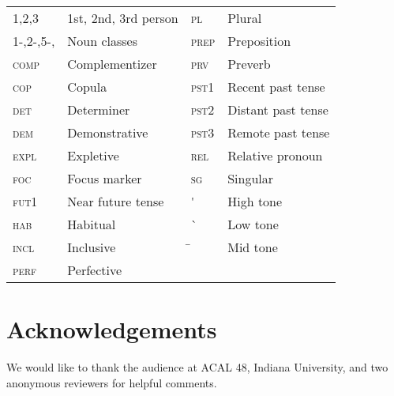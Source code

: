 \documentclass[output=paper,
modfonts
]{langscibook}
\begin{document}
\begin{tabular}{ll|ll}
		1,2,3 	& 1st, 2nd, 3rd person & \textsc{pl}  & Plural   \\ 
        1-,2-,5-, 	& Noun classes &  \textsc{prep}  & Preposition     \\
        \textsc{comp}  & Complementizer  & \textsc{prv}  & Preverb   \\
        \textsc{cop}  & Copula  &  \textsc{pst1}  & Recent past tense \\
        \textsc{det}  & Determiner  & \textsc{pst2}  & Distant past tense  \\
        \textsc{dem}  & Demonstrative  &  \textsc{pst3}  & Remote past tense  \\
        \textsc{expl}  & Expletive  &  \textsc{rel}  & Relative pronoun\\
		\textsc{foc}  & Focus marker  & \textsc{sg}  & Singular  \\
  \textsc{fut1}  & Near future tense  &  \'   & High tone \\
   \textsc{hab}  & Habitual &  \`  & Low tone \\
    \textsc{incl}  & Inclusive  & \=  & Mid tone \\
    \textsc{perf}  & Perfective  &  & \\
\end{tabular}


\section*{Acknowledgements}
We would like to thank the audience at ACAL 48, Indiana University, and two anonymous reviewers for helpful comments.

\printbibliography[heading=subbibliography,notkeyword=this]
\end{document}
